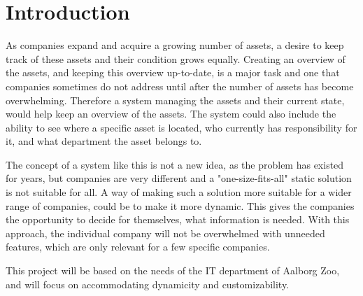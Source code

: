 \chapter{Introduction}\label{ch:introduction}
As companies expand and acquire a growing number of assets, a desire to keep track of these assets and their condition grows equally. Creating an overview of the assets, and keeping this overview up-to-date, is a major task and one that companies sometimes do not address until after the number of assets has become overwhelming. Therefore a system managing the assets and their current state, would help keep an overview of the assets. The system could also include the ability to see where a specific asset is located, who currently has responsibility for it, and what department the asset belongs to.
\par
The concept of a system like this is not a new idea, as the problem has existed for years, but companies are very different and a "one-size-fits-all" static solution is not suitable for all. A way of making such a solution more suitable for a wider range of companies, could be to make it more dynamic. This gives the companies the opportunity to decide for themselves, what information is needed. With this approach, the individual company will not be overwhelmed with unneeded features, which are only relevant for a few specific companies.
\par
This project will be based on the needs of the IT department of Aalborg Zoo, and will focus on accommodating dynamicity and customizability.